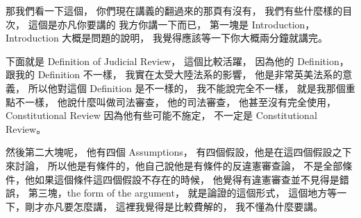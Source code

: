 \hypertarget{w06:cue:24}{}那我們看一下這個，
\hypertarget{w06:cue:25}{}你們現在講義的翻過來的那頁有沒有，
\hypertarget{w06:cue:26}{}我們有些什麼樣的目次，
\hypertarget{w06:cue:27}{}這個是亦凡你要講的 我方你講一下而已，
\hypertarget{w06:cue:28}{}第一塊是 Introduction，
\hypertarget{w06:cue:29}{}Introduction 大概是問題的說明，
\hypertarget{w06:cue:30}{}我覺得應該等一下你大概兩分鐘就講完。

\hypertarget{w06:cue:31}{}下面就是 Definition of Judicial Review，
\hypertarget{w06:cue:32}{}這個比較活躍，
\hypertarget{w06:cue:33}{}因為他的 Definition，
\hypertarget{w06:cue:34}{}跟我的 Definition 不一樣，
\hypertarget{w06:cue:35}{}我實在太受大陸法系的影響，
\hypertarget{w06:cue:36}{}他是非常英美法系的意義，
\hypertarget{w06:cue:37}{}所以他對這個 Definition 是不一樣的，
\hypertarget{w06:cue:38}{}我不能說完全不一樣，
\hypertarget{w06:cue:39}{}就是我那個重點不一樣，
\hypertarget{w06:cue:40}{}他說什麼叫做司法審查，
\hypertarget{w06:cue:41}{}他的司法審查，
\hypertarget{w06:cue:42}{}他甚至沒有完全使用，
\hypertarget{w06:cue:43}{}Constitutional Review
\hypertarget{w06:cue:44}{}因為他有些可能不施定，
\hypertarget{w06:cue:45}{}不一定是 Constitutional Review。

\hypertarget{w06:cue:46}{}然後第二大塊呢，
\hypertarget{w06:cue:47}{}他有四個 Assumptions，
\hypertarget{w06:cue:48}{}有四個假設，他是在這四個假設之下來討論，
\hypertarget{w06:cue:49}{}所以他是有條件的，他自己說他是有條件的反違憲審查論，
\hypertarget{w06:cue:50}{}不是全部條件，他如果這個條件這四個假設不存在的時候，
\hypertarget{w06:cue:51}{}他覺得有違憲審查並不見得是錯誤，
\hypertarget{w06:cue:52}{}第三塊，the form of the argument，
\hypertarget{w06:cue:53}{}就是論證的這個形式，
\hypertarget{w06:cue:54}{}這個地方等一下，剛才亦凡要怎麼講，
\hypertarget{w06:cue:55}{}這裡我覺得是比較費解的，
\hypertarget{w06:cue:56}{}我不懂為什麼要講。

